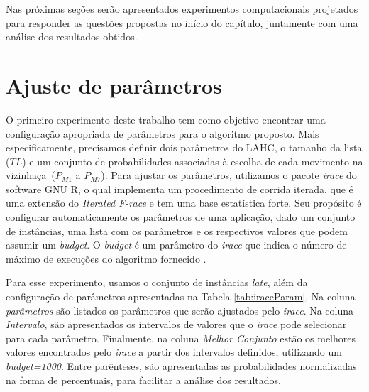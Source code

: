 \documentclass[cic,tc, twoside]{iiufrgs}
\begin{document}
Nas próximas seções serão apresentados experimentos computacionais projetados para responder as questões propostas no início do capítulo, juntamente com uma análise dos resultados obtidos.


\section{Ajuste de parâmetros}\label{exp1}

O primeiro experimento deste trabalho tem como objetivo encontrar uma configuração apropriada de parâmetros para o algoritmo proposto.
Mais especificamente, precisamos definir dois parâmetros do LAHC, o tamanho da lista ($TL$) e um conjunto de probabilidades associadas à escolha de cada movimento na vizinhaça~($P_{M1}$ a $P_{M7}$). 
Para ajustar os parâmetros, utilizamos o pacote \textit{irace} do software GNU R, o qual implementa um procedimento de corrida iterada, que é uma extensão do \textit{Iterated F-race} e tem uma base estatística forte. 
Seu propósito é configurar automaticamente os parâmetros de uma aplicação, dado um conjunto de instâncias, uma lista com os parâmetros e os respectivos valores que podem assumir um \emph{budget}. O \emph{budget} é um parâmetro do \emph{irace} que indica o número de máximo de execuções do algoritmo fornecido \cite{iRaceP}. 

Para esse experimento, usamos o conjunto de instâncias \textit{late}, além da configuração de parâmetros apresentadas 
na Tabela \ref{tab:iraceParam}. Na coluna \textit{parâmetros} são listados os parâmetros que serão ajustados pelo \emph{irace}.
Na coluna \textit{Intervalo}, são apresentados os intervalos de valores que o \textit{irace} pode selecionar para cada parâmetro. 
Finalmente, na coluna \textit{Melhor Conjunto} estão os melhores valores encontrados pelo \textit{irace} a partir dos intervalos definidos, utilizando um \emph{budget=1000}.
Entre parênteses, são apresentadas as probabilidades normalizadas na forma de percentuais, para facilitar a análise dos resultados.
\end{document}
